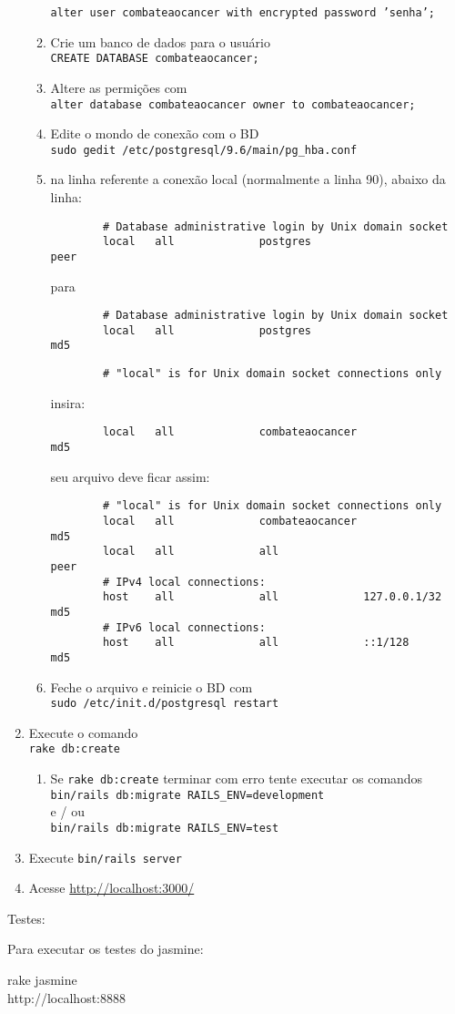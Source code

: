 \documentclass[12pt,a4paper]{article}
\begin{document}
\begin{enumerate}
\begin{enumerate}
		\texttt{alter user combateaocancer with encrypted password 'senha';}
		\item Crie um banco de dados para o usuário \\
		\texttt{CREATE DATABASE combateaocancer;}
		\item Altere as permições com\\
		\texttt{alter database combateaocancer owner to combateaocancer;}
		\item Edite o mondo de conexão com o BD\\
		\texttt{sudo gedit /etc/postgresql/9.6/main/pg\_hba.conf}
		\item na linha referente a conexão local (normalmente a linha 90), abaixo da linha:
		\begin{verbatim}
		# Database administrative login by Unix domain socket
		local   all             postgres                           peer
		\end{verbatim}
		para
		\begin{verbatim}
		# Database administrative login by Unix domain socket
		local   all             postgres                           md5
		\end{verbatim}
		\begin{verbatim}
		# "local" is for Unix domain socket connections only
		\end{verbatim}
		insira:
		\begin{verbatim}
		local   all             combateaocancer                    md5
		\end{verbatim}
		seu arquivo deve ficar assim:
		\begin{verbatim}
		# "local" is for Unix domain socket connections only
		local   all             combateaocancer                    md5
		local   all             all                                peer
		# IPv4 local connections:
		host    all             all             127.0.0.1/32       md5
		# IPv6 local connections:
		host    all             all             ::1/128            md5
		\end{verbatim}
		\item Feche o arquivo e reinicie o BD com \\
		\texttt{sudo /etc/init.d/postgresql restart}
	\end{enumerate}
	\item Execute o comando\\
	\texttt{rake db:create}
	\begin{enumerate}
		\item Se \texttt{rake db:create} terminar com erro tente executar os comandos\\
		\texttt{bin/rails db:migrate RAILS\_ENV=development}\\
		e / ou\\
		\texttt{bin/rails db:migrate RAILS\_ENV=test}
	\end{enumerate}
	\item Execute \texttt{bin/rails server}
	\item Acesse \url{http://localhost:3000/}
\end{enumerate}

Testes:

Para executar os testes do jasmine:

rake jasmine\\
http://localhost:8888
\end{document}
